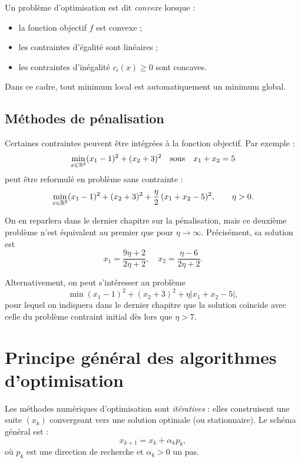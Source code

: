 \begin{definition}
Un problème d’optimisation est dit \emph{convexe} lorsque :
\begin{itemize}
  \item la fonction objectif $f$ est convexe ;
  \item les contraintes d’égalité sont linéaires ;
  \item les contraintes d’inégalité $c_i(x)\ge 0$ sont concaves.
\end{itemize}
\end{definition}

Dans ce cadre, tout minimum local est automatiquement un minimum global.

\subsection{Méthodes de pénalisation}

Certaines contraintes peuvent être intégrées à la fonction objectif.  
Par exemple :
\[
\min_{x\in\mathbb{R}^2} (x_1-1)^2+(x_2+3)^2\quad\text{sous}\quad x_1+x_2=5
\]
peut être reformulé en problème sans contrainte :
\[
\min_{x\in\mathbb{R}^2} (x_1-1)^2+(x_2+3)^2
+ \frac{\eta}{2}\,(x_1+x_2-5)^2, \qquad \eta>0.
\]

On en reparlera dans le dernier chapitre sur la pénalisation, mais ce deuxième problème n'est équivalent au premier que pour $\eta\to\infty$. Précisément, sa solution est 
\[
x_1 = \frac{9\eta +2}{2\eta +2}, \quad x_2 = \frac{\eta - 6}{2\eta + 2}.
\]

Alternativement, on peut s'intéresser au problème 
\[
\min (x_1-1)^2 + (x_2+3)^2 +\eta |x_1+x_2 -5|,
\] 
pour lequel on indiquera dans le dernier chapitre que la solution coïncide avec celle du problème contraint initial dès lors que $\eta > 7$.

\section{Principe général des algorithmes d'optimisation}

Les méthodes numériques d’optimisation sont \emph{itératives} : elles construisent une suite
$(x_k)$ convergeant vers une solution optimale (ou stationnaire). Le schéma général est :
\[
x_{k+1}=x_k+\alpha_k p_k,
\]
où $p_k$ est une direction de recherche et $\alpha_k>0$ un pas.

